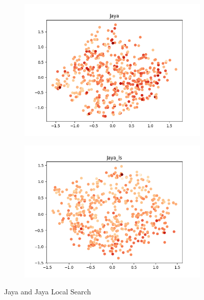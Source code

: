\documentclass[11pt, letterpaper, onecolumn]{article}
\begin{document}
\begin{figure}[h!]
  \centering
  \begin{subfigure}[b]{0.4\linewidth}
    \includegraphics[width=\linewidth]{graphs/Jaya__pca.png}
  \end{subfigure}
  \begin{subfigure}[b]{0.4\linewidth}
    \includegraphics[width=\linewidth]{graphs/Jaya_ls__pca.png}
  \end{subfigure}
  \caption{Jaya and Jaya Local Search}
  \label{fig:coffee}
\end{figure}
\end{document}
